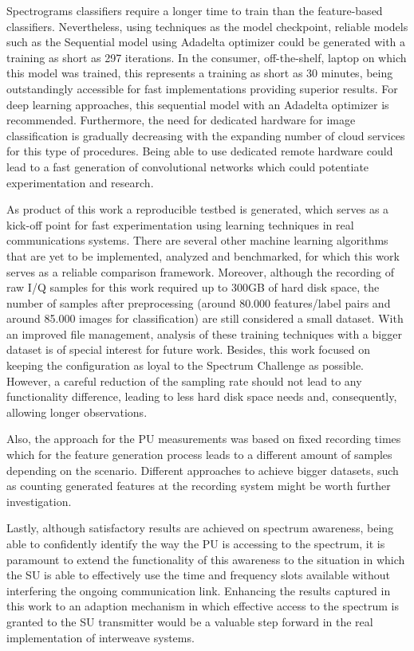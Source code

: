 Spectrograms classifiers require a longer time to train than the feature-based classifiers. Nevertheless, using techniques as the model checkpoint, reliable models such as the Sequential model using Adadelta optimizer could be generated with a training as short as 297 iterations. In the consumer, off-the-shelf, laptop on which this model was trained, this represents a training as short as 30 minutes, being outstandingly accessible for fast implementations  providing superior results. For deep learning approaches, this sequential model with an Adadelta optimizer is recommended.
Furthermore, the need for dedicated hardware for image classification is gradually decreasing with the expanding number of cloud services for this type of procedures. Being able to use dedicated remote hardware could lead to a fast generation of convolutional networks which could potentiate experimentation and research.

As product of this work a reproducible testbed is generated, which serves as a kick-off point for fast experimentation using learning techniques in real communications systems. There are several other machine learning algorithms that are yet to be implemented, analyzed and benchmarked, for which this work serves as a reliable comparison framework. Moreover, although the recording of raw I/Q samples for this work required up to 300GB of hard disk space, the number of samples after preprocessing (around 80.000 features/label pairs and around 85.000 images for classification) are still considered a small dataset. With an improved file management, analysis of these training techniques with a bigger dataset is of special interest for future work. Besides, this work focused on keeping the configuration as loyal to the Spectrum Challenge as possible. However, a careful reduction of the sampling rate should not lead to any functionality difference, leading to less hard disk space needs and, consequently, allowing longer observations.

Also, the approach for the \ac{PU} measurements was based on fixed recording times which for the feature generation process leads to a different amount of samples depending on the scenario. Different approaches to achieve bigger datasets, such as counting generated features at the recording system might be worth further investigation.

Lastly, although satisfactory results are achieved on spectrum awareness, being able to confidently identify the way the \ac{PU} is accessing to the spectrum, it is paramount to extend the functionality of this awareness to the situation in which the \ac{SU} is able to effectively use the time and frequency slots available without interfering the ongoing communication link. Enhancing the results captured in this work to an adaption mechanism in which effective access to the spectrum is granted to the \ac{SU} transmitter would be a valuable step forward in the real implementation of interweave systems.
